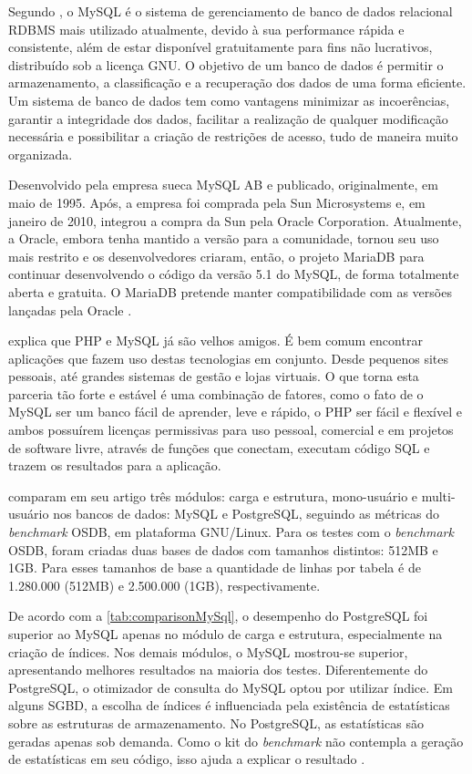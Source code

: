 Segundo , o MySQL é o sistema de gerenciamento de banco de dados relacional RDBMS mais utilizado atualmente, devido à sua performance rápida e consistente, além de estar disponível gratuitamente para fins não lucrativos, distribuído sob a licença GNU. O objetivo de um banco de dados é permitir o armazenamento, a classificação e a recuperação dos dados de uma forma eficiente. Um sistema de banco de dados tem como vantagens minimizar as incoerências, garantir a integridade dos dados, facilitar a realização de qualquer modificação necessária e possibilitar a criação de restrições de acesso, tudo de maneira muito organizada.

Desenvolvido pela empresa sueca MySQL AB e publicado, originalmente, em maio de 1995. Após, a empresa foi comprada pela Sun Microsystems e, em janeiro de 2010, integrou a compra da Sun pela Oracle Corporation. Atualmente, a Oracle, embora tenha mantido a versão para a comunidade, tornou seu uso mais restrito e os desenvolvedores criaram, então, o projeto MariaDB para continuar desenvolvendo o código da versão 5.1 do MySQL, de forma totalmente aberta e gratuita. O MariaDB pretende manter compatibilidade com as versões lançadas pela Oracle \cite{mariadb}.

 explica que PHP e MySQL já são velhos amigos. É bem comum encontrar aplicações que fazem uso destas tecnologias em conjunto. Desde pequenos sites pessoais, até grandes sistemas de gestão e lojas virtuais. O que torna esta parceria tão forte e estável é uma combinação de fatores, como o fato de o MySQL ser um banco fácil de aprender, leve e rápido, o PHP ser fácil e flexível e ambos possuírem licenças permissivas para uso pessoal, comercial e em projetos de software livre, através de funções que conectam, executam código SQL e trazem os resultados para a aplicação.

 comparam em seu artigo três módulos: carga e estrutura, mono-usuário e multi-usuário nos bancos de dados: MySQL e PostgreSQL, seguindo as métricas do \textit{benchmark} OSDB, em plataforma GNU/Linux. Para os testes com o \textit{benchmark} OSDB, foram criadas duas bases de dados com tamanhos distintos: 512MB e 1GB. Para esses tamanhos de base a quantidade de linhas por tabela é de 1.280.000 (512MB) e 2.500.000 (1GB), respectivamente.

De acordo com a \autoref{tab:comparisonMySql}, o desempenho do PostgreSQL foi superior ao MySQL apenas no módulo de carga e estrutura, especialmente na criação de índices. Nos demais módulos, o MySQL mostrou-se superior, apresentando melhores resultados na maioria dos testes. Diferentemente do PostgreSQL, o otimizador de consulta do MySQL optou por utilizar índice. Em alguns SGBD, a escolha de índices é influenciada pela existência de estatísticas sobre as estruturas de armazenamento. No PostgreSQL, as estatísticas são geradas apenas sob demanda. Como o kit do \textit{benchmark} não contempla a geração de estatísticas em seu código, isso ajuda a explicar o resultado \cite{mysql:ufpe}.

